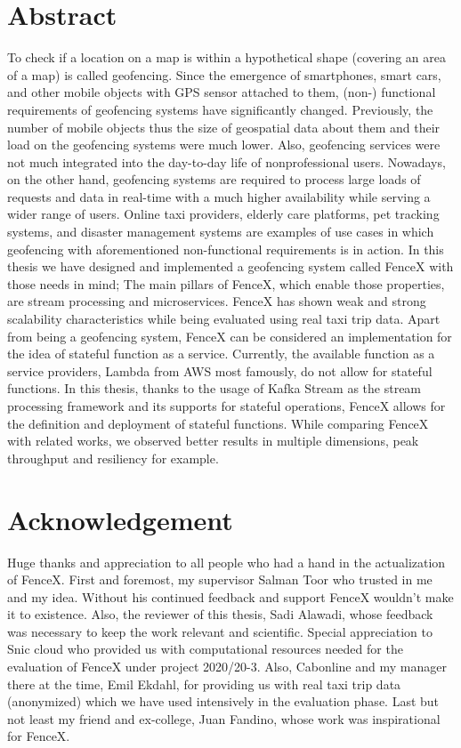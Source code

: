 \documentclass[a4]{report}
\begin{document}
    \section*{Abstract}
    To check if a location on a map is within a hypothetical shape (covering an area of a map) is called geofencing.
    Since the emergence of smartphones, smart cars, and other mobile objects with GPS sensor attached to them, (non-)
    functional requirements of geofencing systems have significantly changed.
    Previously, the number of mobile objects thus the size of geospatial data about them and their load on the
    geofencing systems were much lower.
    Also, geofencing services were not much integrated into the day-to-day life of nonprofessional users.
    Nowadays, on the other hand, geofencing systems are required to process large loads of requests and data in real-time with a much higher availability while serving a wider range of users.
    Online taxi providers, elderly care platforms, pet tracking systems, and disaster management systems are examples
    of use cases in which geofencing with aforementioned non-functional requirements is in action.
    In this thesis we have designed and implemented a geofencing system called FenceX with those needs in mind;
    The main pillars of FenceX, which enable those properties, are stream processing and microservices.
    FenceX has shown weak and strong scalability characteristics while being evaluated using real taxi trip data.
    Apart from being a geofencing system, FenceX can be considered an implementation for the idea of stateful function
    as a service.
    Currently, the available function as a service providers, Lambda from AWS most famously, do not allow for stateful
    functions.
    In this thesis, thanks to the usage of Kafka Stream as the stream processing framework and its supports for stateful
    operations, FenceX allows for the definition and deployment of stateful functions.
    While comparing FenceX with related works, we observed better results in multiple dimensions, peak throughput
    and resiliency for example.

    \section*{Acknowledgement}
    Huge thanks and appreciation to all people who had a hand in the actualization of FenceX.
    First and foremost, my supervisor Salman Toor who trusted in me and my idea.
    Without his continued feedback and support FenceX wouldn't make it to existence.
    Also, the reviewer of this thesis, Sadi Alawadi, whose feedback was necessary to keep the work relevant and
    scientific.
    Special appreciation to Snic cloud who provided us with computational resources needed for the evaluation of FenceX
    under project 2020/20-3.
    Also, Cabonline and my manager there at the time,  Emil Ekdahl, for providing us with real taxi trip data
    (anonymized) which we have used intensively in the evaluation phase.
    Last but not least my friend and ex-college, Juan Fandino, whose work was inspirational for FenceX.
\end{document}
